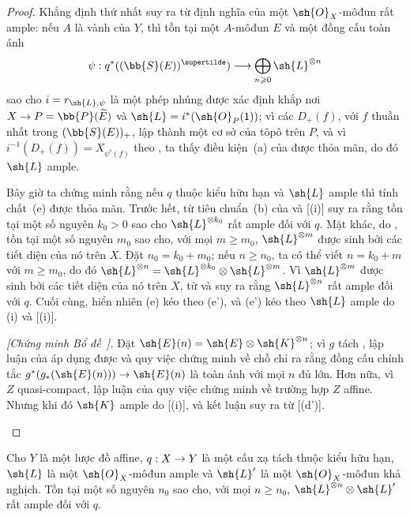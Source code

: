 \documentclass[oneside,10pt]{amsart}
\makeatletter
\renewcommand{\geq}{\geqslant}
\newcommand{\ega@arrow}[2]{\mathchoice{#1}{#2}{#2}{#2}}
\renewcommand{\to}{\ega@arrow{\longrightarrow}{\rightarrow}}
\newcommand{\oldpage}[2][]{\marginnote{\normalfont\footnotesize\textbf{#1}~|~#2}\ignorespaces}
\let\EGAOriginalLabel\label
\renewcommand{\label}[1]{\phantomsection\EGAOriginalLabel{#1}}
\makeatother
\begin{document}
\begin{proof}
Khẳng định thứ nhất suy ra từ định nghĩa  của một $\sh{O}_X$-môđun rất ample:
nếu $A$ là vành của $Y$, thì tồn tại một $A$-môđun $E$ và một đồng cấu toàn ánh
\[
  \psi:q^*((\bb{S}(E))^{\supertilde})\to\bigoplus_{n\geq0}\sh{L}^{\otimes n}
\]
sao cho $i=r_{\sh{L},\psi}$ là một phép nhúng được xác định khắp nơi $X\to P=\bb{P}(\widetilde{E})$ và $\sh{L}=i^*(\sh{O}_P(1))$;
vì các $D_+(f)$, với $f$ thuần nhất trong $(\bb{S}(E))_+$, lập thành một cơ sở của tôpô trên $P$, và vì $i^{-1}(D_+(f))=X_{\psi^\flat(f)}$ theo , ta thấy điều kiện~(a) của  được thỏa mãn, do đó $\sh{L}$ ample.

Bây giờ ta chứng minh rằng nếu $q$ thuộc kiểu hữu hạn và $\sh{L}$ ample thì tính chất~(e) được thỏa mãn.
Trước hết, từ tiêu chuẩn~(b) của  và [(i)] suy ra rằng tồn tại
\oldpage[II]{87}
một số nguyên $k_0>0$ sao cho $\sh{L}^{\otimes k_0}$ rất ample đối với $q$.
Mặt khác, do , tồn tại một số nguyên $m_0$ sao cho, với mọi $m\geq m_0$, $\sh{L}^{\otimes m}$ được sinh bởi các tiết diện của nó trên $X$.
Đặt $n_0=k_0+m_0$;
nếu $n\geq n_0$, ta có thể viết $n=k_0+m$ với $m\geq m_0$, do đó $\sh{L}^{\otimes n}=\sh{L}^{\otimes k_0}\otimes\sh{L}^{\otimes m}$.
Vì $\sh{L}^{\otimes m}$ được sinh bởi các tiết diện của nó trên $X$, từ  và  suy ra rằng $\sh{L}^{\otimes n}$ rất ample đối với $q$.
Cuối cùng, hiển nhiên (e) kéo theo (e'), và (e') kéo theo $\sh{L}$ ample do (i) và [(i)].

  \begin{env}[4.5.10.1]
  \label{II.4.5.10.1}
  \emph{[Chứng minh Bổ đề~].}
  Đặt $\sh{E}(n)=\sh{E}\otimes\sh{K}^{\otimes n}$;
  vì $g$ tách , lập luận của  áp dụng được và quy việc chứng minh về chỗ chỉ ra rằng đồng cấu chính tắc $g^*(g_*(\sh{E}(n)))\to\sh{E}(n)$ là toàn ánh với mọi $n$ đủ lớn.
  Hơn nữa, vì $Z$ quasi-compact, lập luận của  quy việc chứng minh về trường hợp $Z$ affine.
  Nhưng khi đó $\sh{K}$ ample do [(i)], và kết luận suy ra từ [(d')].
  \end{env}
\end{proof}

\begin{corollary}[4.5.11]
\label{II.4.5.11}
Cho $Y$ là một lược đồ affine, $q:X\to Y$ là một cấu xạ tách thuộc kiểu hữu hạn, $\sh{L}$ là một $\sh{O}_X$-môđun ample và $\sh{L}'$ là một $\sh{O}_X$-môđun khả nghịch.
Tồn tại một số nguyên $n_0$ sao cho, với mọi $n\geq n_0$, $\sh{L}^{\otimes n}\otimes\sh{L}'$ rất ample đối với $q$.
\end{corollary}
\end{document}
